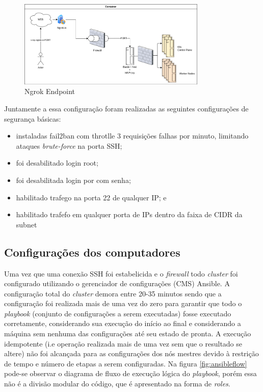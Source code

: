 \begin{figure}[!ht]
    \centering
    \includegraphics[width=0.8\textwidth]{04-figuras/ngroktcp.png}
    \caption{Ngrok Endpoint}
    \label{fig:ngroktcp}
\end{figure}

Juntamente a essa configuração foram realizadas as seguintes configurações de segurança básicas:

\begin{itemize}
    \item instaladas fail2ban com throtlle 3 requisições falhas por minuto, limitando ataques \emph{brute-force} na porta SSH;
    \item foi desabilitado login root;
    \item foi desabilitada login por com senha;
    \item habilitado trafego na porta 22 de qualquer IP; e
    \item habilitado trafefo em qualquer porta de IPs dentro da faixa de CIDR da subnet
\end{itemize}



\subsection{Configurações dos computadores }
Uma vez que uma conexão SSH foi estabelicida e o \emph{firewall} todo  \emph{cluster} foi configurado utilizando o gerenciador de configurações (CMS) Ansible\textregistered. A configuração total do \emph{cluster} demora entre 20-35 minutos sendo que a configuração foi realizada mais de uma vez do zero para garantir que todo o \emph{playbook} (conjunto de configurações a serem executadas) fosse executado corretamente, considerando sua execução do início ao final e considerando a máquina sem nenhuma das configurações até seu estado de pronta. A execução idempotente (i.e operação realizada mais de uma vez sem que o resultado se altere) não foi alcançada para as configurações dos nós mestres devido à restrição de tempo e número de etapas a serem configuradas. Na figura \ref{fig:ansibleflow} pode-se observar o diagrama de fluxo de execução lógica do \emph{playbook}, porém essa não é a divisão modular do código, que é apresentado na forma de \emph{roles}. 

